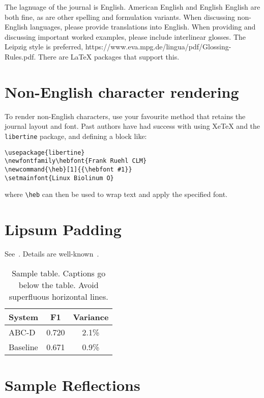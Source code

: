 \documentclass{article}
\begin{document}
The lagnuage of the journal is English. 
American English and English English are both fine, as are other spelling and formulation variants.
When discussing non-English languages, please provide translations into English.
When providing and discussing important worked examples, please include interlinear glosses.
The Leipzig style is preferred, https://www.eva.mpg.de/lingua/pdf/Glossing-Rules.pdf. There are LaTeX packages that support this.

\section{Non-English character rendering}

To render non-English characters, use your favourite method that retains the journal layout and font. Past authors have had success with using XeTeX and the \texttt{libertine} package, and defining a block like:

\begin{verbatim}
\usepackage{libertine}
\newfontfamily\hebfont{Frank Ruehl CLM}
\newcommand{\heb}[1]{{\hebfont #1}}
\setmainfont{Linux Biolinum O}
\end{verbatim}

where \texttt{{\textbackslash}heb} can then be used to wrap text and apply the specified font.

\section{Lipsum Padding}

See~. \lipsum[4] Details are well-known~\cite{devlin2014fast}.

\begin{table}
    \centering
    \begin{tabular}{lcc}
    \hline
    \textbf{System} & \textbf{F1} & \textbf{Variance} \\
    \hline
        ABC-D &  0.720  & 2.1\% \\
        Baseline & 0.671 & 0.9\% \\
    \hline
    \end{tabular}
    \caption{Sample table. Captions go below the table. Avoid superfluous horizontal lines.}
    \label{tab:demotable}
\end{table}

\section{Sample Reflections}
\end{document}
